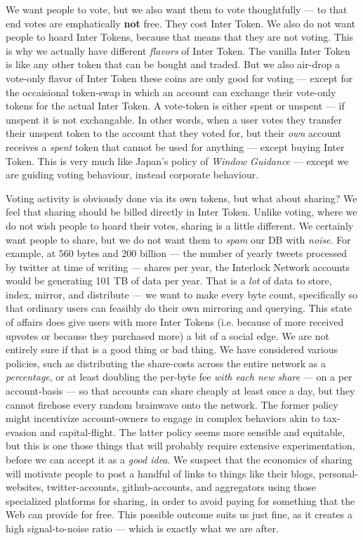 \documentclass[a4paper]{article}
\begin{document}
We want people to vote, but we also want them to vote thoughtfully ---  to that end votes are emphatically \textbf{not} free. They cost Inter Token. We also do not want people to hoard Inter Tokens, because that means that they are not voting. This is why we actually have different \emph{flavors} of Inter Token. The vanilla Inter Token is like any other token that can be bought and traded. But we also air-drop a vote-only flavor of Inter Token these coins are only good for voting ---  except for the occaisional token-swap in which an account can exchange their vote-only tokens for the actual Inter Token. A vote-token is either spent or unspent ---  if unspent it is not exchangable. In other words, when a user votes they transfer their unspent token to the account that they voted for, but their \emph{own} account receives a \emph{spent} token that cannot be used for anything ---  except buying Inter Token. This is very much like Japan's policy of \emph{Window Guidance} ---  except we are guiding voting behaviour, instead corporate behaviour.

Voting activity is obviously done via its own tokens, but what about sharing? We feel that sharing should be billed directly in Inter Token. Unlike voting, where we do not wish people to hoard their votes, sharing is a little different. We certainly want people to share, but we do not want them to \emph{spam} our DB with \emph{noise}. For example, at 560 bytes and 200 billion ---  the number of yearly tweets processed by twitter at time of writing ---  shares per year, the Interlock Network accounts would be generating 101 TB of data per year. That is a \emph{lot} of data to store, index, mirror, and distribute ---  we want to make every byte count, specifically so that ordinary users can feasibly do their own mirroring and querying. This state of affairs does give users with more Inter Tokens (i.e. because of more received upvotes or because they purchased more) a bit of a social edge. We are not entirely sure if that is a good thing or bad thing. We have considered various policies, such as distributing the share-costs across the entire network as a \emph{percentage}, or at least doubling the per-byte fee \emph{with each new share} ---  on a per account-basis ---  so that accounts can share cheaply at least once a day, but they cannot firehose every random brainwave onto the network. The former policy might incentivize account-owners to engage in complex behaviors akin to tax-evasion and capital-flight. The latter policy seems more sensible and equitable, but this is one those things that will probably require extensive experimentation, before we can accept it as a \emph{good idea}. We suspect that the economics of sharing will motivate people to post a handful of links to things like their blogs, personal-websites, twitter-accounts, github-accounts, and aggregators using those specialized platforms for sharing, in order to avoid paying for something that the Web can provide for free. This possible outcome suits us just fine, as it creates a high signal-to-noise ratio ---  which is exactly what we are after.
\end{document}
